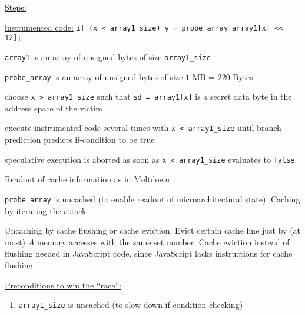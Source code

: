 \documentclass[landscape, a4paper]{article}
\begin{document}
\begin{minipage}[t]{0.198\pagewidth}
\begin{betterlist}
\begin{enumerate}
\begin{betterlist}
			\end{betterlist}
		\end{enumerate}
		\item \underline{Steps:}
		\begin{betterlist}
			\item \underline{instrumented code:} \verb|if (x < array1_size) y = probe_array[array1[x] << 12];|
			\begin{betterlist}
				\item \verb|array1| is an array of unsigned bytes of size \verb|array1_size|
				\item \verb|probe_array| is an array of unsigned bytes of size $1$ MB = $220$ Bytes
				\item choose \verb|x > array1_size| such that \verb|sd = array1[x]| is a secret data byte in the address space of the victim
				\item execute instrumented code several times with \verb|x < array1_size| until branch prediction predicts if-condition to be true
				\item speculative execution is aborted as soon as \verb|x < array1_size| evaluates to \verb|false|.
			\end{betterlist}
			\item Readout of cache information as in Meltdown
			\begin{betterlist}
				\item \verb|probe_array| is uncached (to enable readout of microarchitectural state). Caching by iterating the attack
				\item Uncaching by cache flushing or cache eviction. Evict certain cache line just by (at most) $A$ memory accesses with the same set number. Cache eviction instead of flushing needed in JavaScript code, since JavaScript lacks instructions for cache flushing
			\end{betterlist}
		\end{betterlist}
		\item \underline{Preconditions to win the \enquote{race}:}
		\begin{enumerate}
			\item \verb|array1_size| is uncached (to slow down if-condition checking)

\end{enumerate}
\end{betterlist}
\end{minipage}
\end{document}
